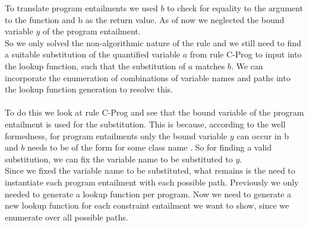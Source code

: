 To translate program entailments 
we used $b$ to check for equality to the argument to the function
and \ovl b as the return value.
As of now we neglected the bound variable $y$ of the program entailment.\\
So we only solved the non-algorithmic nature of the rule
and we still need to find a suitable substitution
of the quantified variable $a$ from rule C-Prog
to input into the lookup function, such that the substitution of $a$ matches $b$.
We can incorporate the enumeration of combinations of variable names and paths
into the lookup function generation to resolve this.\\
\\
To do this we look at rule C-Prog and
see that the bound variable of the program entailment is used
for the substitution.
This is because, according to the well formedness,
for program entailments 
only the bound variable $y$ can occur in \ovl b
and $b$ needs to be of the form 
for some class name .
So for finding a valid substitution,
we can fix the variable name to be substituted to $y$.\\
Since we fixed the variable name to be substituted,
what remains is the need to instantiate each program entailment
with each possible path.
Previously we only needed to generate a lookup function per program.
Now we need to generate a new lookup function
for each constraint entailment we want to show,
since we enumerate over all possible paths.

